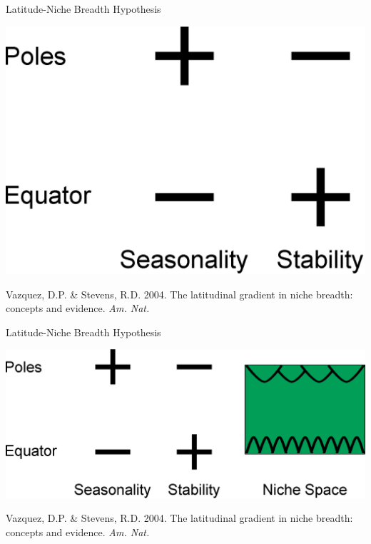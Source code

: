 \documentclass{beamer}
\begin{document}
  \begin{frame}{Latitude-Niche Breadth Hypothesis}

    \begin{center}
      \includegraphics[width=.8\textwidth]{Figures/latitude_niche_breadth_2.eps}
    \end{center}

    \vspace{1.5cm}

    \tiny{Vazquez, D.P. \& Stevens, R.D. 2004. The latitudinal gradient in niche breadth: concepts and evidence. \emph{Am. Nat.}}
  \end{frame}


  \begin{frame}{Latitude-Niche Breadth Hypothesis}

    \begin{center}
      \includegraphics[width=.8\textwidth]{Figures/latitude_niche_breadth_3.eps}
    \end{center}

    \vspace{1.5cm}

    \tiny{Vazquez, D.P. \& Stevens, R.D. 2004. The latitudinal gradient in niche breadth: concepts and evidence. \emph{Am. Nat.}}
  \end{frame}
\end{document}

